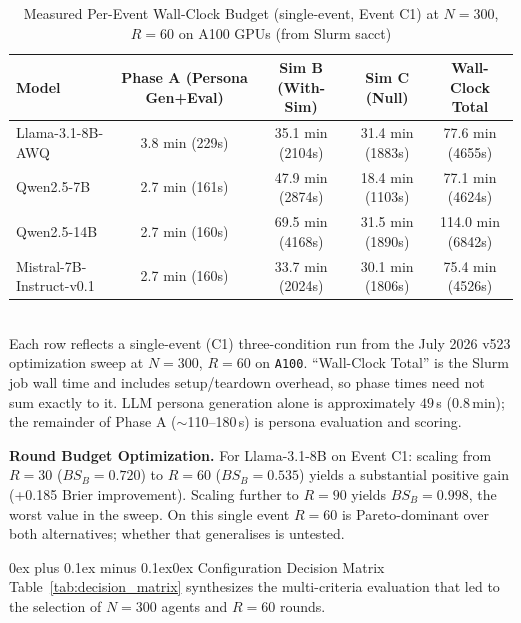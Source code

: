\documentclass[11pt,journal,onecolumn]{IEEEtran}
\makeatletter
\renewcommand\subsubsection{\@startsection{subsubsection}{3}{\parindent}%
  {0ex plus 0.1ex minus 0.1ex}{0ex}%
  {\normalfont\normalsize\bfseries\itshape}}
\makeatother
\begin{document}
\begin{table}[!htbp]
\centering
\caption{Measured Per-Event Wall-Clock Budget (single-event, Event C1) at $N=300$, $R=60$ on A100 GPUs (from Slurm sacct)}
\label{tab:runtime_breakdown}
\footnotesize
\setlength{\tabcolsep}{4pt}
\begin{tabular}{lcccc}
\toprule
\textbf{Model} & \textbf{Phase A (Persona Gen+Eval)} & \textbf{Sim B (With-Sim)} & \textbf{Sim C (Null)} & \textbf{Wall-Clock Total} \\
\midrule
Llama-3.1-8B-AWQ  & 3.8 min (229s)   & 35.1 min (2104s) & 31.4 min (1883s) & 77.6 min (4655s) \\
Qwen2.5-7B    & 2.7 min (161s)   & 47.9 min (2874s) & 18.4 min (1103s) & 77.1 min (4624s) \\
Qwen2.5-14B   & 2.7 min (160s)   & 69.5 min (4168s) & 31.5 min (1890s) & 114.0 min (6842s) \\
Mistral-7B-Instruct-v0.1    & 2.7 min (160s)   & 33.7 min (2024s) & 30.1 min (1806s) & 75.4 min (4526s) \\
\bottomrule
\end{tabular}
\smallskip \\
\footnotesize Each row reflects a single-event (C1) three-condition run from the July 2026 v523 optimization sweep at $N=300$, $R=60$ on \texttt{A100}. ``Wall-Clock Total'' is the Slurm job wall time and includes setup/teardown overhead, so phase times need not sum exactly to it. LLM persona generation alone is approximately $49$\,s ($0.8$\,min); the remainder of Phase A ($\sim$110--180\,s) is persona evaluation and scoring.
\end{table}

\textbf{Round Budget Optimization.} For Llama-3.1-8B on Event C1: scaling from $R=30$ ($BS_B=0.720$) to $R=60$ ($BS_B=0.535$) yields a substantial positive gain (+0.185 Brier improvement). Scaling further to $R=90$ yields $BS_B = 0.998$, the worst value in the sweep. On this single event $R=60$ is Pareto-dominant over both alternatives; whether that generalises is untested.

\subsubsection{Configuration Decision Matrix}
Table~\ref{tab:decision_matrix} synthesizes the multi-criteria evaluation that led to the selection of $N=300$ agents and $R=60$ rounds.
\end{document}
